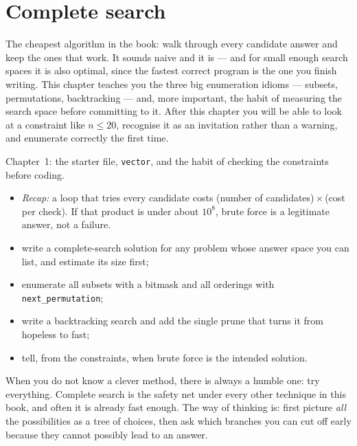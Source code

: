 \chapter{Complete search}\label{ch:search}

The cheapest algorithm in the book: walk through every candidate answer and
keep the ones that work. It sounds naive and it is --- and for small enough
search spaces it is also optimal, since the fastest correct program is the one
you finish writing. This chapter teaches you the three big enumeration
idioms --- subsets, permutations, backtracking --- and, more important, the
habit of measuring the search space before committing to it. After this
chapter you will be able to look at a constraint like $n \le 20$, recognise it
as an invitation rather than a warning, and enumerate correctly the first
time.

\begin{rulebox}
Chapter~1: the starter file, \texttt{vector}, and the habit of checking the constraints before coding.
\begin{itemize}
\item \emph{Recap:} a loop that tries every candidate costs (number of candidates)\,$\times$\,(cost per check). If that product is under about $10^8$, brute force is a legitimate answer, not a failure.
\end{itemize}
\end{rulebox}
\begin{wins}
\begin{itemize}
\item write a complete-search solution for any problem whose answer space you can list, and estimate its size first;
\item enumerate all subsets with a bitmask and all orderings with \texttt{next\_permutation};
\item write a backtracking search and add the single prune that turns it from hopeless to fast;
\item tell, from the constraints, when brute force is the intended solution.
\end{itemize}
\end{wins}
\begin{principle}
When you do not know a clever method, there is always a humble one: try everything. Complete search is the safety net under every other technique in this book, and often it is already fast enough. The way of thinking is: first picture \emph{all} the possibilities as a tree of choices, then ask which branches you can cut off early because they cannot possibly lead to an answer.
\end{principle}

